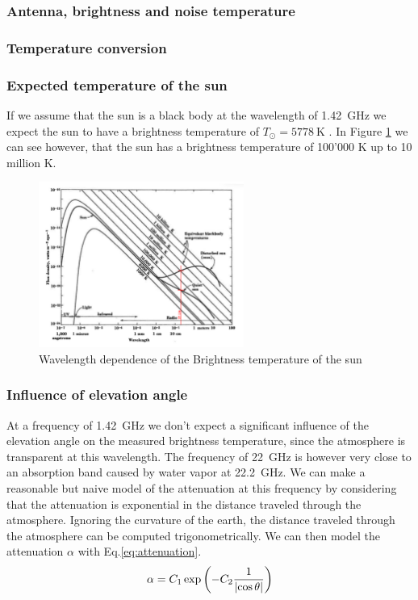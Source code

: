 \subsubsection{Antenna, brightness and noise temperature}

\subsubsection{Temperature conversion}

\subsubsection{Expected temperature of the sun}\label{sec:temp}
If we assume that the sun is a black body at the wavelength of \SI{1.42}{\giga\hertz} we expect the sun to have a brightness temperature of $T_{\odot} = \SI{5778}{\kelvin}$ \cite[p. 211]{durandi_formeln_2011}.
In Figure \ref{fig:sun_temp_theory} we can see however, that the sun has a brightness temperature of 100'000 \si{\kelvin} up to 10 million \si{\kelvin}.
\begin{figure}[H]
    \centering
    \includegraphics[width=0.6\textwidth]{assets/SunBrightnessTheory.png}
    \caption{Wavelength dependence of the Brightness temperature of the sun \cite[p.8-45 Fig. 8-34]{kraus_radio_1986}}
    \label{fig:sun_temp_theory}
\end{figure}

\subsubsection{Influence of elevation angle}
At a frequency of \SI{1.42}{\giga\hertz} we don't expect a significant influence of the elevation angle on the measured brightness temperature, since the atmosphere is transparent at this wavelength.
The frequency of \SI{22}{\giga\hertz} is however very close to an absorption band caused by water vapor  at \SI{22.2}{\giga\hertz}.
We can make a reasonable but naive model of the attenuation at this frequency by considering that the attenuation is exponential in the distance traveled through the atmosphere.
Ignoring the curvature of the earth, the distance traveled through the atmosphere can be computed trigonometrically. We can then model the attenuation $\alpha$ with Eq.\eqref{eq:attenuation}.
\begin{equation}
    \alpha = C_1 \exp{\left( - C_2 \frac{1}{\left\lvert \cos{\theta}\right\rvert} \right)} \label{eq:attenuation}
\end{equation}

